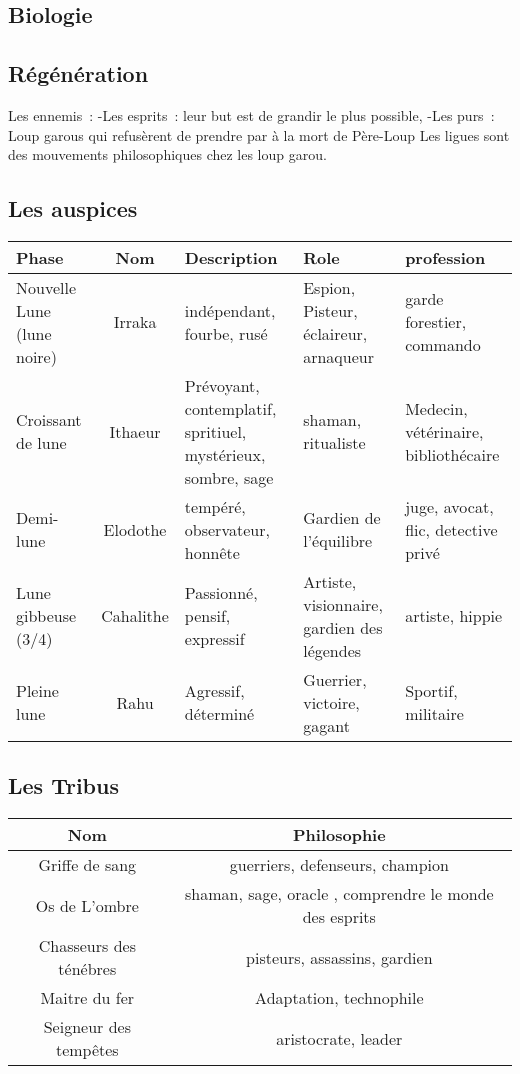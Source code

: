 \documentclass[oneside,12pt]{book}
\begin{document}
\begin{flushleft}
\section{Biologie}
\subsection{Régénération}

Les ennemis :
-Les esprits : leur but est de grandir le plus possible, 
-Les purs : Loup garous qui refusèrent de prendre par à la mort de Père-Loup
Les ligues sont des mouvements philosophiques chez les loup garou.

\subsection {Les auspices}
\begin{tabularx}{19cm}{|X|c|X|X|X|}
\hline
Phase & Nom & Description & Role & profession \\
\hline
Nouvelle Lune (lune noire)  & Irraka & indépendant, fourbe, rusé & Espion, Pisteur, éclaireur, arnaqueur & garde forestier, commando   \\
\hline
Croissant de lune & Ithaeur  & Prévoyant, contemplatif, spritiuel, mystérieux, sombre, sage & shaman, ritualiste & Medecin, vétérinaire, bibliothécaire  \\
\hline
Demi-lune & Elodothe  & tempéré, observateur, honnête & Gardien de l'équilibre & juge, avocat, flic, detective privé  \\
\hline
Lune gibbeuse (3/4) & Cahalithe  & Passionné, pensif, expressif & Artiste, visionnaire, gardien des légendes & artiste, hippie   \\
\hline
Pleine lune  & Rahu & Agressif, déterminé  & Guerrier, victoire, gagant  & Sportif, militaire      \\
\hline
\end{tabularx}

\subsection {Les Tribus}
\begin{tabularx}{15cm}{|c|c|}
\hline
Nom & Philosophie  \\
\hline
Griffe de sang & guerriers, defenseurs, champion    \\
\hline
Os de L'ombre & shaman, sage, oracle , comprendre le monde des esprits  \\
\hline
Chasseurs des ténébres & pisteurs, assassins, gardien  \\
\hline
Maitre du fer  & Adaptation, technophile    \\
\hline
Seigneur des tempêtes  & aristocrate, leader     \\
\hline
\end{tabularx}



\end{flushleft}
\end{document}
